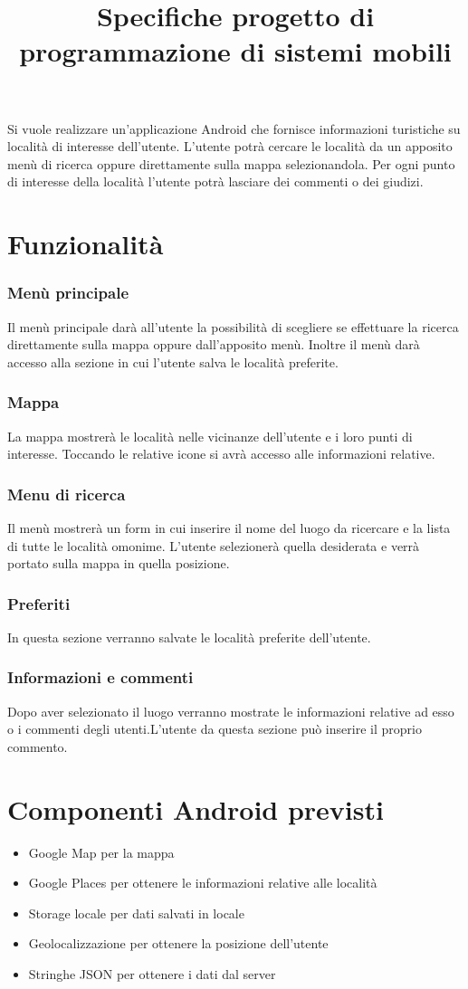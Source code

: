 \documentclass[a4paper,12pt]{article}
\title{Specifiche progetto di programmazione di sistemi mobili}
\begin{document}
\maketitle
Si vuole realizzare un'applicazione Android che fornisce informazioni turistiche su località di interesse dell'utente. L'utente potrà cercare le località da un apposito menù di ricerca oppure direttamente sulla mappa selezionandola. Per ogni punto di interesse della località l'utente potrà lasciare dei commenti o dei giudizi.

\section*{Funzionalità}
\subsubsection*{Menù principale}
Il menù principale darà all'utente la possibilità di scegliere se effettuare la ricerca direttamente sulla mappa oppure dall'apposito menù. Inoltre il menù darà accesso alla sezione in cui l'utente salva le località preferite.
\subsubsection*{Mappa}
La mappa mostrerà le località nelle vicinanze dell'utente e i loro punti di interesse. Toccando le relative icone si avrà accesso alle informazioni relative.
\subsubsection*{Menu di ricerca}
Il menù mostrerà un form in cui inserire il nome del luogo da ricercare e la lista di tutte le località omonime. L'utente selezionerà quella desiderata e verrà portato sulla mappa in quella posizione.
\subsubsection*{Preferiti}
In questa sezione verranno salvate le località preferite dell'utente.
\subsubsection*{Informazioni e commenti} 
Dopo aver selezionato il luogo verranno mostrate le informazioni relative ad esso o i commenti degli utenti.L'utente da questa sezione può inserire il proprio commento.

\section*{Componenti Android previsti}
\begin{itemize}
\item Google Map per la mappa
\item Google Places per ottenere le informazioni relative alle località
\item Storage locale per dati salvati in locale
\item Geolocalizzazione per ottenere la posizione dell'utente
\item Stringhe JSON per ottenere i dati dal server

\end{itemize}
\end{document}
